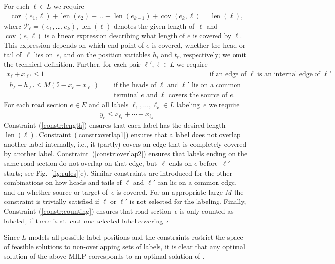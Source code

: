 \documentclass[a4paper,11pt]{article}
\DeclareMathOperator{\length}{len}
\DeclareMathOperator{\covered}{cov}
\begin{document}
For each $\ell\in L$ we require
\begin{align}\label{constr:length}
 \covered(e_1,\ell) + \length(e_2)+\ldots+\length(e_{k-1})+\covered(e_k,\ell) = \length(\ell),
\end{align}
where $\mathcal P_{\ell}=(e_1,\dots,e_k)$, $\length(\ell)$ denotes the given
length of~$\ell$ and $\covered(e,\ell)$ is a linear expression
describing what length of $e$ is covered by $\ell$. This expression
depends on which end point of $e$ is covered, whether the head or tail
of~$\ell$ lies on~$e$, and on the position variables $h_\ell$ and $t_\ell$,
respectively; we omit the technical definition.
Further, for each pair $\ell',\ell \in L$ we require
\begin{align}
  x_\ell+x_{\ell'}\leq 1  & \quad\text{ if an edge of $\ell$ is an internal edge of $\ell'$ }\label{constr:overlap1}\\
 \begin{split}
  h_\ell-h_{\ell'} \leq M(2-x_\ell-x_{\ell'}) & \quad\text{ if the heads of~$\ell$ and $\ell'$ lie on a common}\label{constr:overlap2}\\[-.75ex]
  & \quad\text{ terminal~$e$ and $\ell$ covers the source of~$e$.}
 \end{split}
\end{align}
For each road section $e\in E$ and all labels $\ell_1,\dots,\ell_k\in L$ labeling~$e$ we require
\begin{align}
y_e  \leq x_{\ell_1}+\cdots+x_{\ell_k}\label{constr:counting}
\end{align}
Constraint~(\ref{constr:length}) ensures that each label has the
desired length~$\length(\ell)$. Constraint~(\ref{constr:overlap1})
ensures that a label does not overlap another label internally, i.e.,
it (partly) covers an edge that is completely covered by another
label. Constraint~(\ref{constr:overlap2}) ensures that labels ending
on the same road section do not overlap on that edge, but~$\ell$ ends
on $e$ before~$\ell'$ starts; see Fig.~\ref{fig:rules}(c). Similar
constraints are introduced for the other combinations on how heads and
tails of $\ell$ and $\ell'$ can lie on a common edge, and on whether
source or target of~$e$ is covered. For an appropriate large $M$ the
constraint is trivially satisfied if $\ell$ or $\ell'$ is not selected
for the labeling.  Finally, Constraint~(\ref{constr:counting}) ensures
that road section~$e$ is only counted as labeled, if there is at least
one selected label covering~$e$.

Since $L$ models all possible label positions and the constraints restrict the space of feasible solutions to non-overlapping sets of labels, it is clear that any optimal solution of the above MILP corresponds to an optimal solution of \MaxTotalCovering.
\end{document}

